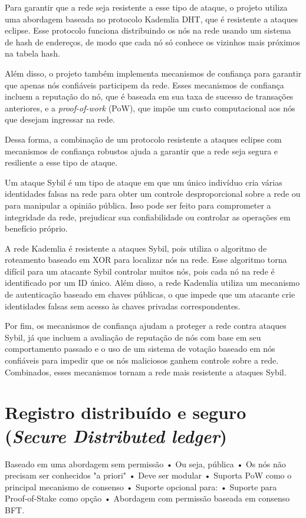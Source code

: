\documentclass[conference]{IEEEtran}
\begin{document}
    Para garantir que a rede seja resistente a esse tipo de ataque, o projeto utiliza uma abordagem baseada no protocolo Kademlia DHT, que é resistente a ataques eclipse. Esse protocolo funciona distribuindo os nós na rede usando um sistema de hash de endereços, de modo que cada nó só conhece os vizinhos mais próximos na tabela hash.

    Além disso, o projeto também implementa mecanismos de confiança para garantir que apenas nós confiáveis participem da rede. Esses mecanismos de confiança incluem a reputação do nó, que é baseada em sua taxa de sucesso de transações anteriores, e a \textit{proof-of-work} (PoW), que impõe um custo computacional aos nós que desejam ingressar na rede.

    Dessa forma, a combinação de um protocolo resistente a ataques eclipse com mecanismos de confiança robustos ajuda a garantir que a rede seja segura e resiliente a esse tipo de ataque.

    Um ataque Sybil é um tipo de ataque em que um único indivíduo cria várias identidades falsas na rede para obter um controle desproporcional sobre a rede ou para manipular a opinião pública. Isso pode ser feito para comprometer a integridade da rede, prejudicar sua confiabilidade ou controlar as operações em benefício próprio.

    A rede Kademlia é resistente a ataques Sybil, pois utiliza o algoritmo de roteamento baseado em XOR para localizar nós na rede. Esse algoritmo torna difícil para um atacante Sybil controlar muitos nós, pois cada nó na rede é identificado por um ID único. Além disso, a rede Kademlia utiliza um mecanismo de autenticação baseado em chaves públicas, o que impede que um atacante crie identidades falsas sem acesso às chaves privadas correspondentes.

    Por fim, os mecanismos de confiança ajudam a proteger a rede contra ataques Sybil, já que incluem a avaliação de reputação de nós com base em seu comportamento passado e o uso de um sistema de votação baseado em nós confiáveis para impedir que os nós maliciosos ganhem controle sobre a rede. Combinados, esses mecanismos tornam a rede mais resistente a ataques Sybil.\\

    \section{Registro distribuído e seguro (\textit{Secure Distributed ledger})}
    Baseado em uma abordagem sem permissão
    • Ou seja, pública
    • Os nós não precisam ser conhecidos "a priori"
    • Deve ser modular
    • Suporta PoW como o principal mecanismo de consenso
    • Suporte opcional para:
    • Suporte para Proof-of-Stake como opção
    • Abordagem com permissão baseada em consenso BFT.
\end{document}
